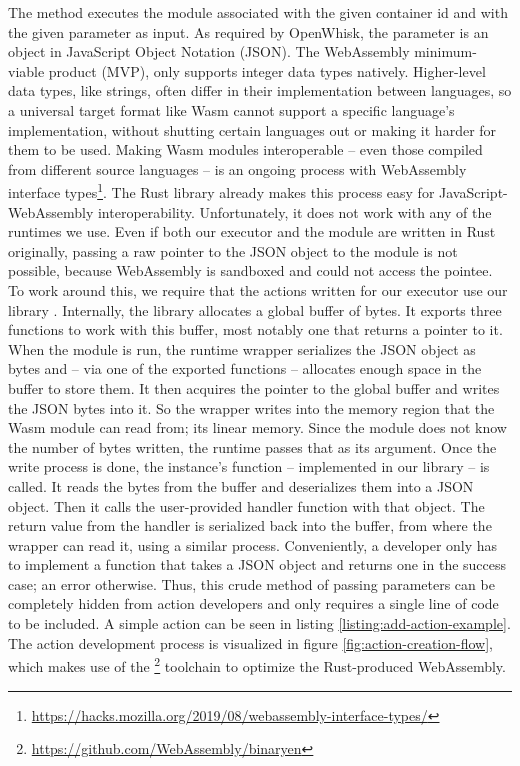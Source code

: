 The  method executes the module associated with the given container id and with the given parameter as input. As required by OpenWhisk, the parameter is an object in JavaScript Object Notation (JSON). The WebAssembly minimum-viable product (MVP), only supports integer data types natively. Higher-level data types, like strings, often differ in their implementation between languages, so a universal target format like Wasm cannot support a specific language's implementation, without shutting certain languages out or making it harder for them to be used. Making Wasm modules interoperable -- even those compiled from different source languages -- is an ongoing process with WebAssembly interface types\footnote{\url{https://hacks.mozilla.org/2019/08/webassembly-interface-types/}}. The  Rust library already makes this process easy for JavaScript-WebAssembly interoperability. Unfortunately, it does not work with any of the runtimes we use. Even if both our executor and the module are written in Rust originally, passing a raw pointer to the JSON object to the module is not possible, because WebAssembly is sandboxed and could not access the pointee. To work around this, we require that the actions written for our executor use our library . Internally, the library allocates a global buffer of bytes. It exports three functions to work with this buffer, most notably one that returns a pointer to it. When the module is run, the runtime wrapper serializes the JSON object as bytes and -- via one of the exported functions -- allocates enough space in the buffer to store them. It then acquires the pointer to the global buffer and writes the JSON bytes into it. So the wrapper writes into the memory region that the Wasm module can read from; its linear memory. Since the module does not know the number of bytes written, the runtime passes that as its  argument.
Once the write process is done, the instance's  function -- implemented in our library -- is called. It reads the  bytes from the buffer and deserializes them into a JSON object. Then it calls the user-provided handler function with that object. The return value from the handler is serialized back into the buffer, from where the wrapper can read it, using a similar process.
Conveniently, a developer only has to implement a function that takes a JSON object and returns one in the success case; an error otherwise. Thus, this crude method of passing parameters can be completely hidden from action developers and only requires a single line of code to be included. A simple action can be seen in listing \ref{listing:add-action-example}. The action development process is visualized in figure \ref{fig:action-creation-flow}, which makes use of the \footnote{\url{https://github.com/WebAssembly/binaryen}} toolchain to optimize the Rust-produced WebAssembly.
